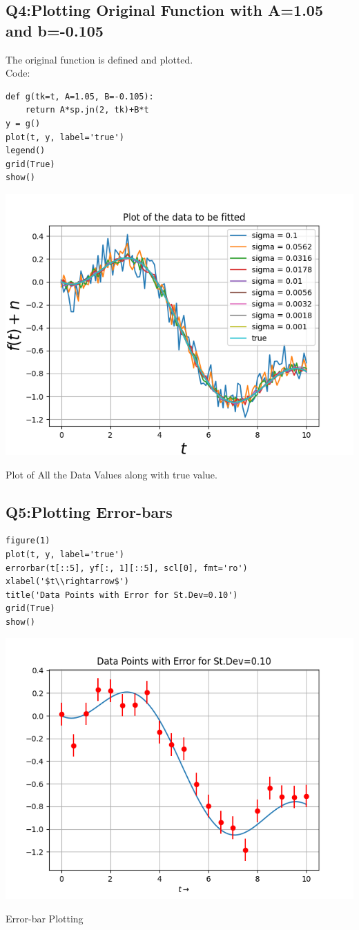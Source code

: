 \documentclass[12pt, a4paper]{report}
\begin{document}
\subsection{Q4:Plotting Original Function with A=1.05 and b=-0.105}
The original function is defined and plotted.\\Code:
\begin{verbatim}
def g(tk=t, A=1.05, B=-0.105):
    return A*sp.jn(2, tk)+B*t
y = g()
plot(t, y, label='true')
legend()
grid(True)
show()
\end{verbatim}
	\centering
	\includegraphics[scale=0.8]{Figure_0.png}
	\caption{Plot of All the Data Values along with true value.}
	
\subsection{Q5:Plotting Error-bars}
\begin{verbatim}
figure(1)
plot(t, y, label='true')
errorbar(t[::5], yf[:, 1][::5], scl[0], fmt='ro')
xlabel('$t\\rightarrow$')
title('Data Points with Error for St.Dev=0.10')
grid(True)
show()
\end{verbatim}
	\centering
	\includegraphics[scale=0.8]{Figure_1.png}  
	\caption{Error-bar Plotting}
\end{document}
